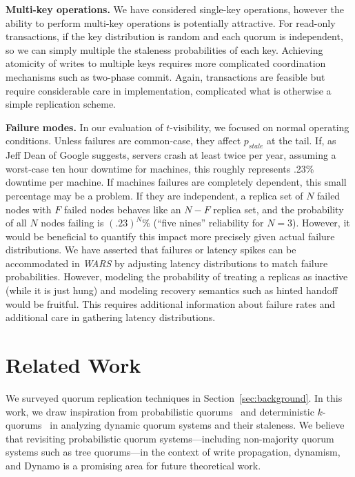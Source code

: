 \documentclass{vldb}
\begin{document}
\textbf{Multi-key operations.} We have considered single-key operations,
however the ability to perform multi-key operations is potentially
attractive.  For read-only transactions, if the key distribution is
random and each quorum is independent, so we can simply multiple the
staleness probabilities of each key.  Achieving atomicity of writes to
multiple keys requires more complicated coordination mechanisms such
as two-phase commit.  Again, transactions are feasible but require
considerable care in implementation, complicated what is otherwise a
simple replication scheme.

\textbf{Failure modes.} In our evaluation of $t$-visibility, we
focused on normal operating conditions. Unless failures are
common-case, they affect $p_{stale}$ at the tail.  If, as Jeff Dean of
Google suggests, servers crash at least twice per year, assuming a
worst-case ten hour downtime for machines, this roughly represents
.23\% downtime per machine.  If machines failures are completely
dependent, this small percentage may be a problem.  If they are
independent, a replica set of $N$ failed nodes with $F$ failed nodes
behaves like an $N-F$ replica set, and the probability of all $N$
nodes failing is $(.23)^N$\% (``five nines'' reliability for
$N$$=$$3$).  However, it would be beneficial to quantify this impact
more precisely given actual failure distributions.  We have asserted
that failures or latency spikes can be accommodated in \textit{WARS}
by adjusting latency distributions to match failure probabilities.
However, modeling the probability of treating a replicas as inactive
(while it is just hung) and modeling recovery semantics such as hinted
handoff would be fruitful.  This requires additional information about
failure rates and additional care in gathering latency distributions.

\section{Related Work}
\label{sec:relatedwork}

We surveyed quorum replication techniques in
Section~\ref{sec:background}.  In this work, we draw inspiration from
probabilistic quorums~\cite{prob-quorum} and deterministic
$k$-quorums~\cite{multi-k-quorum, non-strict} in analyzing dynamic
quorum systems and their staleness.  We believe that revisiting
probabilistic quorum systems---including non-majority quorum systems
such as tree quorums---in the context of write propagation, dynamism,
and Dynamo is a promising area for future theoretical work.
\end{document}
